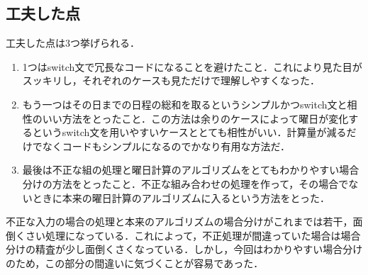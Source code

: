 \documentclass{jlreq}
\begin{document}
  \subsection*{工夫した点}
  工夫した点は3つ挙げられる．
  \begin{enumerate}[(1.)  ]
    \item 1つはswitch文で冗長なコードになることを避けたこと．これにより見た目がスッキリし，それぞれのケースも見ただけで理解しやすくなった．
    \item もう一つはその日までの日程の総和を取るというシンプルかつswitch文と相性のいい方法をとったこと．この方法は余りのケースによって曜日が変化するというswitch文を用いやすいケースととても相性がいい．計算量が減るだけでなくコードもシンプルになるのでかなり有用な方法だ．
    \item 最後は不正な組の処理と曜日計算のアルゴリズムをとてもわかりやすい場合分けの方法をとったこと．不正な組み合わせの処理を作って，その場合でないときに本来の曜日計算のアルゴリズムに入るという方法をとった．
  \end{enumerate}
  不正な入力の場合の処理と本来のアルゴリズムの場合分けがこれまでは若干，面倒くさい処理になっている．これによって，不正処理が間違っていた場合は場合分けの精査が少し面倒くさくなっている．しかし，今回はわかりやすい場合分けのため，この部分の間違いに気づくことが容易であった．
\end{document}
